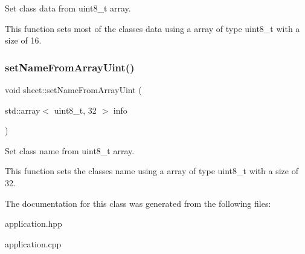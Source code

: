 Set class data from uint8\+\_\+t array. 

This function sets most of the classes data using a array of type uint8\+\_\+t with a size of 16. \mbox{\label{classsheet_a3d9fc4c4f4cdd28f6d9accffb0037136}} 
\subsubsection{\texorpdfstring{set\+Name\+From\+Array\+Uint()}{setNameFromArrayUint()}}
{\footnotesize\ttfamily void sheet\+::set\+Name\+From\+Array\+Uint (\begin{DoxyParamCaption}\item[{std\+::array$<$ uint8\+\_\+t, 32 $>$}]{info }\end{DoxyParamCaption})}



Set class name from uint8\+\_\+t array. 

This function sets the classes name using a array of type uint8\+\_\+t with a size of 32. 

The documentation for this class was generated from the following files\+:\begin{DoxyCompactItemize}
\item 
application.\+hpp\item 
application.\+cpp\end{DoxyCompactItemize}
